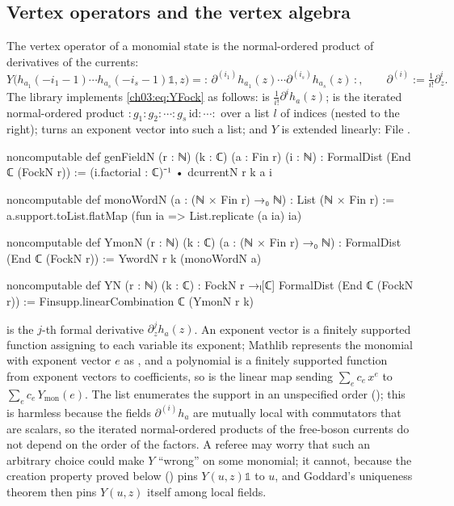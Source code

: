 \subsection{Vertex operators and the vertex algebra}

The vertex operator of a monomial state is the normal-ordered product of derivatives of the
currents:
\begin{equation}\label{ch03:eq:YFock}
  Y\bigl(h_{a_1}(-i_1-1)\cdots h_{a_s}(-i_s-1)\mathbb 1,z\bigr)
   = {:}\,\partial^{(i_1)}h_{a_1}(z)\cdots\partial^{(i_s)}h_{a_s}(z)\,{:},
  \qquad \partial^{(i)}:=\tfrac{1}{i!}\partial_z^i .
\end{equation}
The library implements \eqref{ch03:eq:YFock} as follows:  is
$\frac1{i!}\partial^ih_a(z)$;  is the iterated normal-ordered product
${:}g_1{:}g_2{:}\cdots{:}g_s\,\mathrm{id}{:}\cdots{:}$ over a list $l$ of indices (nested to the
right);  turns an exponent vector into such a list; and $Y$ is extended linearly:
\noindent File .
\begin{leancode}
noncomputable def genFieldN (r : ℕ) (k : ℂ) (a : Fin r) (i : ℕ) :
    FormalDist (End ℂ (FockN r)) :=
  (i.factorial : ℂ)⁻¹ • dcurrentN r k a i

noncomputable def monoWordN (a : (ℕ × Fin r) →₀ ℕ) : List (ℕ × Fin r) :=
  a.support.toList.flatMap (fun ia => List.replicate (a ia) ia)

noncomputable def YmonN (r : ℕ) (k : ℂ) (a : (ℕ × Fin r) →₀ ℕ) :
    FormalDist (End ℂ (FockN r)) := YwordN r k (monoWordN a)

noncomputable def YN (r : ℕ) (k : ℂ) : FockN r →ₗ[ℂ] FormalDist (End ℂ (FockN r)) :=
  Finsupp.linearCombination ℂ (YmonN r k)
\end{leancode}

\begin{dictionary}
 is the $j$-th formal derivative $\partial_z^jh_a(z)$. An exponent vector
 is a finitely supported function assigning to each variable its exponent;
Mathlib represents the monomial with exponent vector $e$ as , and a polynomial
is a finitely supported function from exponent vectors to coefficients, so
 is the linear map sending
$\sum_e c_e\,x^e$ to $\sum_e c_e\,Y_{\mathrm{mon}}(e)$. The list  enumerates the
support in an unspecified order (); this is harmless because the fields
$\partial^{(i)}h_a$ are mutually local with commutators that are scalars, so the iterated
normal-ordered products of the free-boson currents do not depend on the order of the factors. A
referee may worry that such an arbitrary choice could make $Y$ ``wrong'' on some monomial; it
cannot, because the creation property proved below () pins $Y(u,z)\mathbb 1$ to
$u$, and Goddard's uniqueness theorem then pins $Y(u,z)$ itself among local fields.
\end{dictionary}

